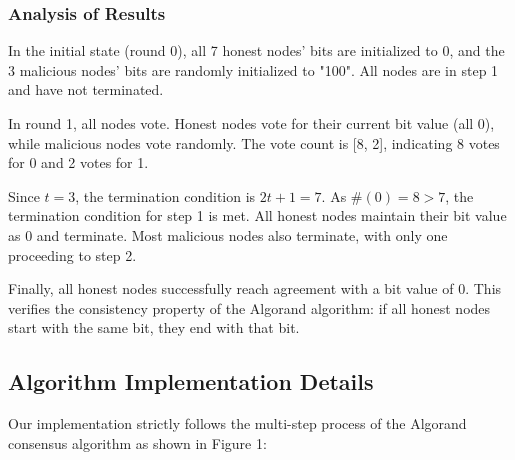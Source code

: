 \documentclass[12pt,a4paper]{article}
\begin{document}
\subsubsection{Analysis of Results}

In the initial state (round 0), all 7 honest nodes' bits are initialized to 0, and the 3 malicious nodes' bits are randomly initialized to "100". All nodes are in step 1 and have not terminated.

In round 1, all nodes vote. Honest nodes vote for their current bit value (all 0), while malicious nodes vote randomly. The vote count is [8, 2], indicating 8 votes for 0 and 2 votes for 1.

Since $t=3$, the termination condition is $2t+1 = 7$. As $\#(0)=8 > 7$, the termination condition for step 1 is met. All honest nodes maintain their bit value as 0 and terminate. Most malicious nodes also terminate, with only one proceeding to step 2.

Finally, all honest nodes successfully reach agreement with a bit value of 0. This verifies the consistency property of the Algorand algorithm: if all honest nodes start with the same bit, they end with that bit.

\subsection{Algorithm Implementation Details}

Our implementation strictly follows the multi-step process of the Algorand consensus algorithm as shown in Figure 1:
\end{document}
